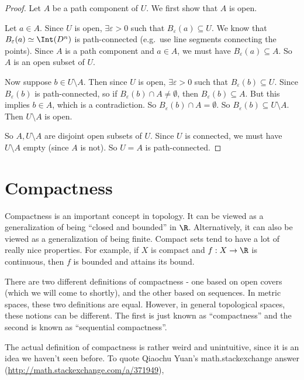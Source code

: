 \documentclass[a4paper]{article}
\begin{document}
\begin{proof}
  Let $A$ be a path component of $U$. We first show that $A$ is open.

  Let $a\in A$. Since $U$ is open, $\exists \varepsilon > 0$ such that $B_\varepsilon(a) \subseteq U$. We know that $B_\varepsilon(a) \simeq \Int(D^n)$ is path-connected (e.g.\ use line segments connecting the points). Since $A$ is a path component and $a\in A$, we must have $B_\varepsilon(a) \subseteq A$. So $A$ is an open subset of $U$.

  Now suppose $b\in U\setminus A$. Then since $U$ is open, $\exists \varepsilon > 0$ such that $B_\varepsilon(b) \subseteq U$. Since $B_\varepsilon(b)$ is path-connected, so if $B_\varepsilon(b) \cap A \not= \emptyset$, then $B_\varepsilon(b)\subseteq A$. But this implies $b\in A$, which is a contradiction. So $B_\varepsilon(b) \cap A = \emptyset$. So $B_\varepsilon(b) \subseteq U\setminus A$. Then $U\setminus A$ is open.

  So $A, U\setminus A$ are disjoint open subsets of $U$. Since $U$ is connected, we must have $U\setminus A$ empty (since $A$ is not). So $U = A$ is path-connected.
\end{proof}

\section{Compactness}
Compactness is an important concept in topology. It can be viewed as a generalization of being ``closed and bounded'' in $\R$. Alternatively, it can also be viewed as a generalization of being finite. Compact sets tend to have a lot of really nice properties. For example, if $X$ is compact and $f: X \to \R$ is continuous, then $f$ is bounded and attains its bound.

There are two different definitions of compactness - one based on open covers (which we will come to shortly), and the other based on sequences. In metric spaces, these two definitions are equal. However, in general topological spaces, these notions can be different. The first is just known as ``compactness'' and the second is known as ``sequential compactness''.

The actual definition of compactness is rather weird and unintuitive, since it is an idea we haven't seen before. To quote Qiaochu Yuan's math.stackexchange answer (\url{http://math.stackexchange.com/a/371949}),
\end{document}
